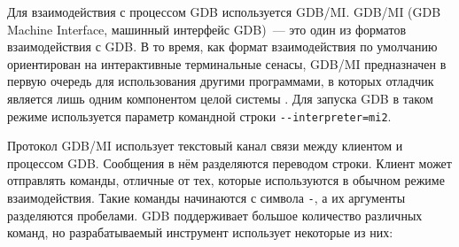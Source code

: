 \documentclass[a4paper,article,14pt]{extarticle}
\begin{document}
Для взаимодействия с процессом GDB используется GDB/MI. GDB/MI (GDB Machine Interface, машинный интерфейс GDB)~--- это один из форматов взаимодействия с GDB. В то время, как формат взаимодействия по умолчанию ориентирован на интерактивные терминальные сенасы, GDB/MI предназначен в первую очередь для использования другими программами, в которых отладчик является лишь одним компонентом целой системы \cite{gdb}. Для запуска GDB в таком режиме используется параметр командной строки \texttt{-{}-interpreter=mi2}.

Протокол GDB/MI использует текстовый канал связи между клиентом и процессом GDB. Сообщения в нём разделяются переводом строки. Клиент может отправлять команды, отличные от тех, которые используются в обычном режиме взаимодействия. Такие команды начинаются с символа \texttt{-}, а их аргументы разделяются пробелами. GDB поддерживает большое количество различных команд, но разрабатываемый инструмент использует некоторые из них:
\end{document}
